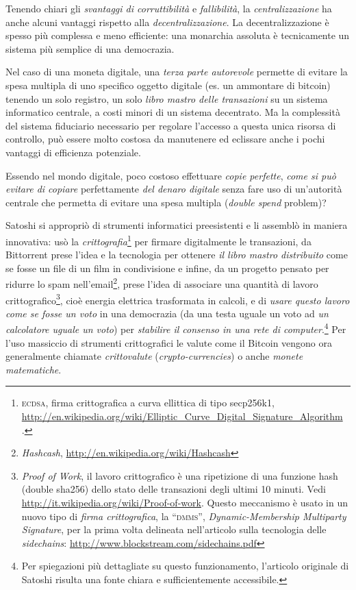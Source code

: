 \documentclass[a4paper,12pt,italian]{article}
\newcommand{\longurl}[1]{%
\href{#1}{\ttfamily \smaller #1}%
}%
\begin{document}
Tenendo chiari gli \emph{svantaggi di corruttibilità} e \emph{fallibilità}, la \emph{centralizzazione} 
ha anche alcuni vantaggi rispetto alla \emph{decentralizzazione}. La decentralizzazione è spesso più
complessa e meno efficiente: una monarchia assoluta è tecnicamente un sistema
più semplice di una democrazia. 

\smallskip


Nel caso di una moneta digitale, una \emph{terza parte autorevole} permette di evitare la spesa multipla
di uno specifico oggetto digitale (es. un ammontare di bitcoin) tenendo un solo registro, un solo \emph{libro mastro delle transazioni} su 
un sistema informatico centrale, a costi minori di un sistema decentrato. Ma la complessità del sistema fiduciario necessario per 
regolare l'accesso a questa unica risorsa di controllo, può essere molto costosa da manutenere ed eclissare anche i pochi vantaggi di efficienza potenziale.

\smallskip
Essendo nel
mondo digitale, poco costoso effettuare \emph{copie perfette}, \emph{come si
può evitare di copiare} perfettamente \emph{del denaro digitale} senza fare uso di un'autorità centrale
che permetta di evitare una spesa multipla (\emph{double spend} problem)?


\smallskip

Satoshi si appropriò di strumenti informatici preesistenti e li assemblò
in maniera innovativa: usò la \emph{crittografia}\footnote{\textsc{ecdsa}, firma
crittografica a curva ellittica di tipo secp256k1, 
\longurl{http://en.wikipedia.org/wiki/Elliptic\_Curve\_Digital\_Signature\_Algorithm
}.} per firmare digitalmente le transazioni, da
Bittorrent prese
l’idea e la tecnologia per ottenere \emph{il libro mastro distribuito} come se
fosse un file di un film in condivisione e infine, da un progetto
pensato per ridurre lo spam nell'email\footnote{\emph{Hashcash},
\url{http://en.wikipedia.org/wiki/Hashcash}}, prese l’idea di associare una
quantità di lavoro crittografico\footnote{\emph{Proof of Work}, il lavoro
crittografico è una ripetizione di una funzione hash (double sha256)
dello stato delle transazioni degli ultimi 10 minuti. Vedi
\url{http://it.wikipedia.org/wiki/Proof-of-work}. Questo meccanismo è usato in un nuovo 
tipo di \emph{firma crittografica}, la ``\textsc{dmms}'', \emph{Dynamic-Membership Multiparty Signature}, per la
prima volta delineata nell'articolo sulla tecnologia delle \emph{sidechains}: \url{http://www.blockstream.com/sidechains.pdf}}, cioè energia
elettrica trasformata in calcoli, e di \emph{usare questo lavoro come se
fosse un voto} in una democrazia (da una testa uguale un voto ad \emph{un calcolatore
uguale un voto}) per \emph{stabilire il consenso in una rete di computer}.\footnote{Per
spiegazioni più dettagliate su questo funzionamento, l’articolo
originale di Satoshi risulta una fonte chiara e sufficientemente
accessibile.}
Per l'uso massiccio di strumenti crittografici le valute come il Bitcoin vengono ora generalmente chiamate
\emph{crittovalute} (\emph{crypto-currencies}) o anche \emph{monete matematiche}.
\end{document}
